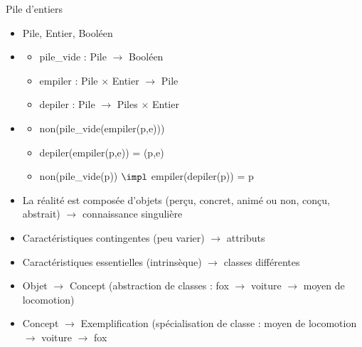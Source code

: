  Pile d'entiers
\begin{itemize}
	\item Pile, Entier, Booléen
	\item 
		\begin{itemize}
			\item pile\_vide : Pile $\rightarrow$ Booléen
			\item empiler : Pile $\times$ Entier $\rightarrow$ Pile
			\item depiler : Pile $\rightarrow$ Piles $\times$ Entier
		\end{itemize}
	\item
		\begin{itemize}
			\item non(pile\_vide(empiler(p,e)))
			\item depiler(empiler(p,e)) = (p,e)
			\item non(pile\_vide(p)) $\impl$ empiler(depiler(p)) = p
		\end{itemize}
\end{itemize}

\begin{itemize}
	\item La réalité est composée d'objets (perçu, concret, animé ou non, conçu, abstrait) $\rightarrow$ connaissance singulière
	\item Caractéristiques contingentes (peu varier) $\rightarrow$ attributs
	\item Caractéristiques essentielles (intrinsèque) $\rightarrow$ classes différentes
	\item Objet $\rightarrow$ Concept (abstraction de classes : fox $\rightarrow$ voiture $\rightarrow$ moyen de locomotion)
	\item Concept $\rightarrow$ Exemplification (spécialisation de classe : moyen de locomotion $\rightarrow$ voiture $\rightarrow$ fox
\end{itemize}

